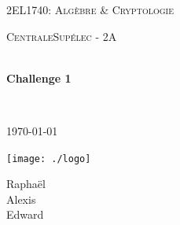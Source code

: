 \begin{titlepage}
\begin{center}


\LARGE \textsc{2EL1740: Algèbre \& Cryptologie}

\vspace{0.2cm}

\Large \textsc{CentraleSupélec - 2A}

\vspace{0.3cm}

\HRule \\[0.4cm]

{\huge \bfseries Challenge 1\\
[0.2cm]}

\HRule \\[0.4cm]

\vspace{2cm}

\textsc{\today}

\vspace{2cm}

\texttt{[image: ./logo]}~\\[3cm]

\begin{minipage}{0.4\textwidth}
\begin{spacing}{1.125}
\begin{center}
    Raphaël \\
    Alexis \\
    Edward 
\end{center}
\end{spacing}
\end{minipage}

\vfill

\end{center}
\end{titlepage}